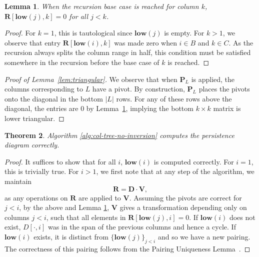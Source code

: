 \documentclass{article}
\newtheorem{theorem}{Theorem}[section]
\newtheorem{lemma}[theorem]{Lemma}
\newcommand{\mat}[1]{\mathbf{#1}}
\newcommand{\low}{\mathbf{low}}
\newcommand{\Remark}[1]{\textcolor{blue}{[#1]}}
\begin{document}
\begin{lemma}\label{lem:recurse}
When the recursion base case is reached for column $k$, $\mat{R}[\low(j),k]=0$ for all $j<k$.
\end{lemma}
\begin{proof}
For $k=1$, this is tautological since $\low  (j)$ is empty. For $k>1$, we observe that entry $\mat{R}[\low  (i),k]$ was made zero when $i\in B$ and $k\in C$. As the recursion always splits the column range in half, this condition must be satisfied somewhere in the recursion before the base case of $k$ is reached.
\end{proof}

\begin{proof}[Proof of Lemma~\ref{lem:triangular}]
    We observe that when $\mat{P}_L$ is applied, the columns corresponding to $L$ have a pivot.  By construction,  $\mat{P}_L$ places the pivots onto the diagonal in the bottom $|L|$ rows. For any of these rows above the diagonal, the entries are 0 by Lemma~\ref{lem:recurse}, implying the bottom $k\times k$ matrix is lower triangular. 
\end{proof}
\begin{theorem}
Algorithm \ref{alg:col-tree-no-inversion} computes the persistence diagram correctly.
\end{theorem}
\begin{proof}
It suffices to show that for all $i$, $\low(i)$ is computed correctly. For $i=1$, this is trivially true. For $i>1$, we first note that at any step of the algorithm, we maintain 
\[\mat{R} = \mat{D}\cdot \mat{V},\]
as any operations on $\mat{R}$ are applied to $\mat{V}$.  
Assuming the pivots are correct for $j<i$, by the above and Lemma \ref{lem:recurse}, $\mat{V}$ gives a transformation depending only on columns $j<i$, such that all elements in $\mat{R}[\low (j),i]=0$. If $\low (i)$ does not exist, $D[\cdot,i]$ was in the span of the previous columns and hence a cycle.  If $\low (i)$ exists, it  is distinct from $\{\low (j)\}_{j<i}$ and so we have a new pairing. The correctness of this pairing follows from the Pairing Uniqueness Lemma~\cite{cohen2006vines}. 
\end{proof}
\end{document}
